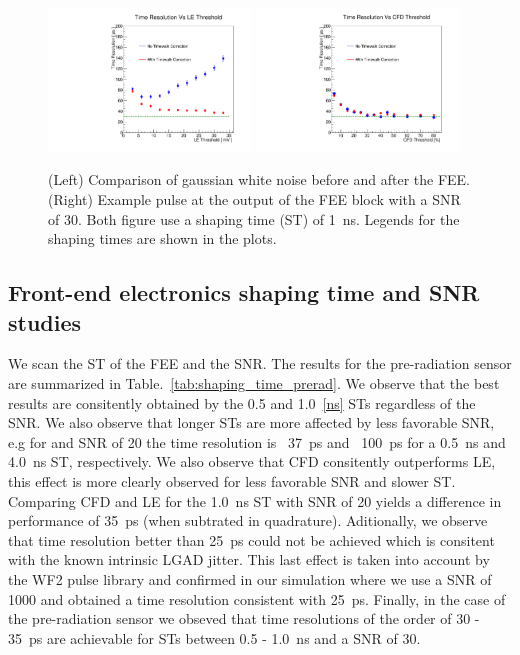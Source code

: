 \documentclass[preprint,1p]{elsarticle}
\begin{document}
\begin{figure}[htbp]
  \centering
  \includegraphics[width=0.48\textwidth]{figs/ShapingTime1p0_SNR30_55MicronGain15Prerad_FIXED_NOISE_FIXED_SNR_V2_converted_TimeResolutionVsThresholdToT.pdf} \hfill
  \includegraphics[width=0.48\textwidth]{figs/ShapingTime1p0_SNR30_55MicronGain15Prerad_FIXED_NOISE_FIXED_SNR_V2_converted_TimeResolutionVsThresholdCFD.pdf}
  \caption{(Left) Comparison of gaussian white noise before and after the FEE.
  (Right) Example pulse at the output of the FEE block with a SNR of 30. Both figure use a shaping time (ST) of 1~\si{ns}. Legends for the shaping times are shown in the plots.}
  \label{fig:time_resolution_scan}
\end{figure}

\subsection{Front-end electronics shaping time and SNR studies}\label{sec:shaping_time}
We scan the ST of the FEE and the SNR. The results for the pre-radiation sensor are summarized in Table.~\ref{tab:shaping_time_prerad}.
 We observe that the best results are consitently obtained by the 0.5 and 1.0~\ref{ns} STs regardless of the SNR. We also observe that
 longer STs are more affected by less favorable SNR, e.g for and SNR of 20 the time resolution is ~37~\si{ps} and ~100~\si{ps} for a
 0.5~\si{ns} and 4.0~\si{ns} ST, respectively. We also observe that CFD consitently outperforms LE, this effect is more clearly observed
 for less favorable SNR and slower ST. Comparing CFD and LE for the 1.0~\si{ns} ST with SNR of 20 yields a difference in performance of
 35~\si{ps} (when subtrated in quadrature). Aditionally, we observe that time resolution better than 25~\si{ps} could not be achieved which
 is consitent with the known intrinsic LGAD jitter. This last effect is taken into account by the WF2 pulse library and confirmed in our
 simulation where we use a SNR of 1000 and obtained a time resolution consistent with 25~\si{ps}. Finally, in the case of the pre-radiation sensor
 we obseved that time resolutions of the order of 30 - 35~\si{ps} are achievable for STs between 0.5 - 1.0~\si{ns} and a SNR of 30.
\end{document}
